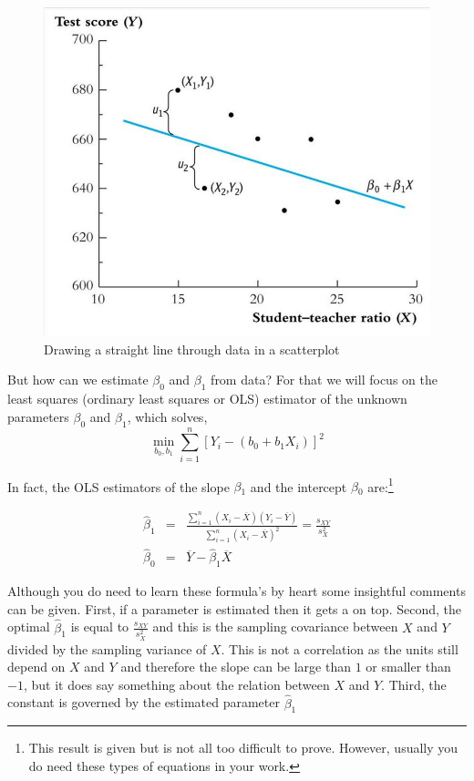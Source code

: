 \documentclass[
]{book}
\begin{document}
\begin{figure}
\includegraphics[width=11.17in]{./figures/Lecture1_sheet8} \caption{Drawing a straight line through data in a scatterplot}\label{fig:unire}
\end{figure}

But how can we estimate \(\beta_0\) and \(\beta_1\) from data? For that we will focus on the least squares (ordinary least squares or OLS) estimator of the unknown parameters \(\beta_0\) and \(\beta_1\), which solves,
\begin{equation}
    \min_{b_0,b_1} \sum^n_{i=1} \left[Y_i - (b_0 + b_1 X_i) \right]^2
\end{equation}

In fact, the OLS estimators of the slope \(\beta\)\(_1\) and the intercept \(\beta\)\(_0\) are:\footnote{This result is given but is not all too difficult to prove. However, usually you do need these types of equations in your work.}

\begin{eqnarray}
    \hat{\beta}_1 &=& \frac{\sum^n_{i=1}(X_i - \overline{X})(Y_i - \overline{Y})}{\sum^n_{i=1}(X_i - \overline{X})^2} = \frac{s_{XY}}{s^2_X}\\
    \hat{\beta}_0 &=& \overline{Y} - \hat{\beta}_1\overline{X}
\end{eqnarray}

Although you do need to learn these formula's by heart some insightful comments can be given. First, if a parameter is estimated then it gets a on top. Second, the optimal \(\hat{\beta}_1\) is equal to \(\frac{s_{XY}}{s^2_X}\) and this is the sampling covariance between \(X\) and \(Y\) divided by the sampling variance of \(X\). This is not a correlation as the units still depend on \(X\) and \(Y\) and therefore the slope can be large than \(1\) or smaller than \(-1\), but it does say something about the relation between \(X\) and \(Y\). Third, the constant is governed by the estimated parameter \(\hat{\beta}_1\)
\end{document}
